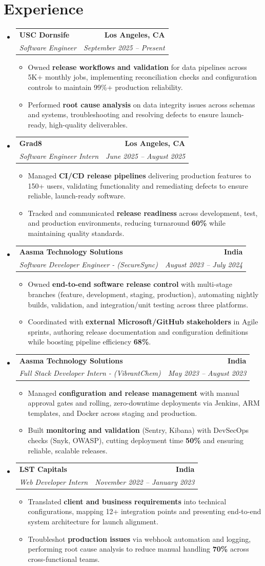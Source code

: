 \documentclass[letterpaper,10pt]{article}
\makeatletter
\newcommand{\resumeItem}[1]{\item\small{{#1 \vspace{-2pt}}}}
\newcommand{\resumeSubheading}[4]{\vspace{-1pt}\item\begin{tabular*}{1.0\textwidth}[t]{l@{\extracolsep{\fill}}r}\textbf{#1} & \textbf{\small #2} \\\textit{\small#3} & \textit{\small #4} \\\end{tabular*}\vspace{-2pt}}
\newcommand{\resumeSubHeadingListStart}{\begin{itemize}[leftmargin=0.0in, label={}]}
\newcommand{\resumeSubHeadingListEnd}{\end{itemize}}
\newcommand{\resumeItemListStart}{\begin{itemize}[leftmargin=0.15in,label=\textbullet,itemsep=2pt,topsep=0pt,parsep=0pt,partopsep=0pt]}
\newcommand{\resumeItemListEnd}{\end{itemize}\vspace{-4pt}}
\makeatother
\begin{document}
\section{Experience}
\resumeSubHeadingListStart
\resumeSubheading{USC Dornsife}{Los Angeles, CA}{Software Engineer}{September 2025 -- Present}
\resumeItemListStart
\resumeItem{Owned \textbf{release workflows and validation} for data pipelines across 5K+ monthly jobs, implementing reconciliation checks and configuration controls to maintain 99\%+ production reliability.}
\resumeItem{Performed \textbf{root cause analysis} on data integrity issues across schemas and systems, troubleshooting and resolving defects to ensure launch-ready, high-quality deliverables.}
\resumeItemListEnd
\resumeSubheading{Grad8}{Los Angeles, CA}{Software Engineer Intern}{June 2025 -- August 2025}
\resumeItemListStart
\resumeItem{Managed \textbf{CI/CD release pipelines} delivering production features to 150+ users, validating functionality and remediating defects to ensure reliable, launch-ready software.}
\resumeItem{Tracked and communicated \textbf{release readiness} across development, test, and production environments, reducing turnaround \textbf{60\%} while maintaining quality standards.}
\resumeItemListEnd
\resumeSubheading{Aasma Technology Solutions}{India}{Software Developer Engineer - (SecureSync)}{August 2023 -- July 2024}
\resumeItemListStart
\resumeItem{Owned \textbf{end-to-end software release control} with multi-stage branches (feature, development, staging, production), automating nightly builds, validation, and integration/unit testing across three platforms.}
\resumeItem{Coordinated with \textbf{external Microsoft/GitHub stakeholders} in Agile sprints, authoring release documentation and configuration definitions while boosting pipeline efficiency \textbf{68\%}.}
\resumeItemListEnd
\resumeSubheading{Aasma Technology Solutions}{India}{Full Stack Developer Intern - (VibrantChem)}{May 2023 -- August 2023}
\resumeItemListStart
\resumeItem{Managed \textbf{configuration and release management} with manual approval gates and rolling, zero-downtime deployments via Jenkins, ARM templates, and Docker across staging and production.}
\resumeItem{Built \textbf{monitoring and validation} (Sentry, Kibana) with DevSecOps checks (Snyk, OWASP), cutting deployment time \textbf{50\%} and ensuring reliable, scalable releases.}
\resumeItemListEnd
\resumeSubheading{LST Capitals}{India}{Web Developer Intern}{November 2022 -- January 2023}
\resumeItemListStart
\resumeItem{Translated \textbf{client and business requirements} into technical configurations, mapping 12+ integration points and presenting end-to-end system architecture for launch alignment.}
\resumeItem{Troubleshot \textbf{production issues} via webhook automation and logging, performing root cause analysis to reduce manual handling \textbf{70\%} across cross-functional teams.}
\resumeItemListEnd
\resumeSubHeadingListEnd
\vspace{-6pt}
\end{document}
